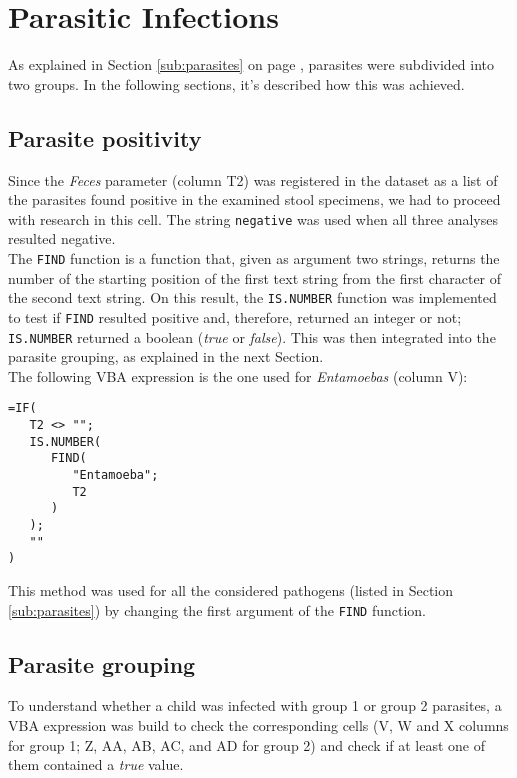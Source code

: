 \section{Parasitic Infections}\label{asec:parasiticinfections}
As explained in Section \ref{sub:parasites} on page \pageref{sub:parasites}, parasites were subdivided into two groups. In the following sections, it's described how this was achieved.

\subsection{Parasite positivity}\label{asub:parasitespos}
Since the \textit{Feces} parameter (column T2) was registered in the dataset as a list of the parasites found positive in the examined stool specimens, we had to proceed with research in this cell. The string \texttt{negative} was used when all three analyses resulted negative.\\
The \texttt{FIND} function is a function that, given as argument two strings, returns the number of the starting position of the first text string from the first character of the second text string. On this result, the \texttt{IS.NUMBER} function was implemented to test if \texttt{FIND} resulted positive and, therefore, returned an integer or not; \texttt{IS.NUMBER} returned a boolean (\textit{true} or \textit{false}). This was then integrated into the parasite grouping, as explained in the next Section.\\
The following VBA expression is the one used for \textit{Entamoebas} (column V):

\begin{lstlisting}
=IF(
   T2 <> "";
   IS.NUMBER(
      FIND(
         "Entamoeba";
         T2
      )
   );
   ""
)
\end{lstlisting}

This method was used for all the considered pathogens (listed in Section \ref{sub:parasites}) by changing the first argument of the \texttt{FIND} function.

\subsection{Parasite grouping}\label{asub:parasitegrouping}
To understand whether a child was infected with group 1 or group 2 parasites, a VBA expression was build to check the corresponding cells (V, W and X columns for group 1; Z, AA, AB, AC, and AD for group 2) and check if at least one of them contained a \textit{true} value.

